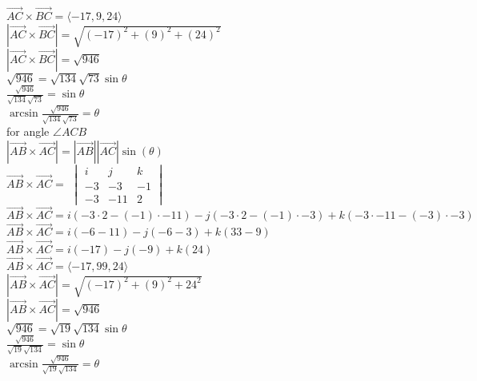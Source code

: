 \documentclass{article}
\begin{document}
\\[0.1in]$\vec{AC} \times \vec{BC} = \langle-17,9,24\rangle$
\\[0.1in]$|\vec{AC} \times \vec{BC}| = \sqrt{(-17)^2+(9)^2+(24)^2}$
\\[0.1in]$|\vec{AC} \times \vec{BC}| = \sqrt{946}$
\\[0.1in]$\sqrt{946} = \sqrt{134}\sqrt{73}\sin\theta$
\\[0.1in]$\frac{\sqrt{946}}{\sqrt{134}\sqrt{73}} = \sin\theta$
\\[0.1in]$\arcsin\frac{\sqrt{946}}{\sqrt{134}\sqrt{73}} = \theta$
\\[0.1in]\boxed{\theta = 18.12\degree} for angle $\angle ACB$
\\[0.1in]$|\vec{AB}\times \vec{AC}|=|\vec{AB}||\vec{AC}|\sin(\theta)$
\\[0.1in]$\vec{AB} \times \vec{AC} = $
$\begin{vmatrix}
i & j & k \\
-3 & -3 & -1 \\
-3 & -11 & 2
\end{vmatrix}$
\\[0.1in]$\vec{AB} \times \vec{AC} = i(-3\cdot2-(-1)\cdot -11)-j(-3\cdot 2-(-1)\cdot -3)+k(-3\cdot-11-(-3)\cdot -3)$
\\[0.1in]$\vec{AB} \times \vec{AC} = i(-6-11)-j(-6-3)+k(33-9)$
\\[0.1in]$\vec{AB} \times \vec{AC} = i(-17)-j(-9)+k(24)$
\\[0.1in]$\vec{AB} \times \vec{AC} = \langle-17,99,24\rangle$
\\[0.1in]$|\vec{AB} \times \vec{AC}| = \sqrt{(-17)^2+(9)^2+24^2}$
\\[0.1in]$|\vec{AB} \times \vec{AC}| = \sqrt{946}$
\\[0.1in]$\sqrt{946}=\sqrt{19}\sqrt{134}\sin\theta$
\\$\frac{\sqrt{946}}{\sqrt{19}\sqrt{134}}=\sin\theta$
\\$\arcsin\frac{\sqrt{946}}{\sqrt{19}\sqrt{134}}=\theta$
\\[0.1in]\boxed{\theta=37.56\degree}
\end{document}
